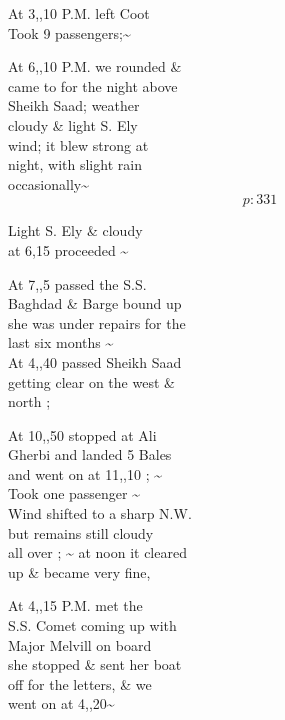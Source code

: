 \documentclass{report}
\begin{document}
	\par{
 	At 3,,10 P.M. left Coot\ \\Took 9 passengers;\~{}\ \\
	}

	\par{
 	At 6,,10 P.M. we rounded \&\ \\came to for the night above\ \\Sheikh Saad; weather\ \\cloudy \& light S. Ely\ \\wind; it blew strong at\ \\night, with slight rain\ \\occasionally\~{}\ \\
  \[p: 331 \]

	}



	\par{
 	Light S. Ely \& cloudy\ \\at 6,15 proceeded \~{}\ \\
	}

	\par{
 	At 7,,5 passed the S.S.\ \\Baghdad \& Barge bound up\ \\she was under repairs for the\ \\last six months \~{}\ \\At 4,,40 passed Sheikh Saad\ \\getting clear on the west \&\ \\north ;\ \\
	}

	\par{
 	At 10,,50 stopped at Ali\ \\Gherbi and landed 5 Bales\ \\and went on at 11,,10 ; \~{}\ \\Took one passenger \~{}\ \\Wind shifted to a sharp N.W.\ \\but remains still cloudy\ \\all over ; \~{} at noon it cleared\ \\up \& became very fine,\ \\
	}

	\par{
 	At 4,,15 P.M. met the\ \\S.S. Comet coming up with\ \\Major Melvill on board\ \\she stopped \& sent her boat\ \\off for the letters, \& we\ \\went on at 4,,20\~{}\ \\
	}
\end{document}
